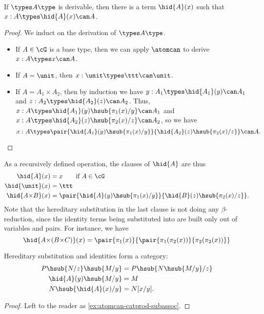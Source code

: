 \begin{lem}\label{thm:catprod-atomcan-idadm}
  If $\types A\type$ is derivable, then there is a term $\hid{A}(x)$ such that $x:A \types \hid{A}(x)\can A$.
\end{lem}
\begin{proof}
  We induct on the derivation of $\types A\type$.
  \begin{itemize}
  \item If $A\in\cG$ is a base type, then we can apply $\atomcan$ to derive $x:A \types x\can A$.
  \item If $A=\unit$, then $x:\unit \types \ttt\can \unit$.
  \item If $A=A_1\times A_2$, then by induction we have $y:A_1 \types \hid{A_1}(y)\can A_1$ and $z:A_2 \types \hid{A_2}(z)\can A_2$.
    Thus, $x:A \types \hid{A_1}(y)\hsub{\pi_1(x)/y}\can A_1$ and $x:A \types \hid{A_2}(z)\hsub{\pi_2(x)/z}\can A_2$, so we have
    \[ x:A \types \pair{\hid{A_1}(y)\hsub{\pi_1(x)/y}}{\hid{A_2}(z)\hsub{\pi_2(x)/z}} \can A.\qedhere\]
  \end{itemize}
\end{proof}

As a recursively defined operation, the clauses of $\hid{A}$ are thus
\begin{align*}
  \hid{A}(x) &= x \qquad\text{if }{A\in\cG}\\
  \hid{\unit}(x) &= \ttt\\
  \hid{A\times B}(x) &= \pair{\hid{A}(y)\hsub{\pi_1(x)/y}}{\hid{B}(z)\hsub{\pi_2(x)/z}}.
\end{align*}
Note that the hereditary substitution in the last clause is not doing any $\beta$-reduction, since the identity terms being substituted into are built only out of variables and pairs.
For instance, we have
\[ \hid{A\times (B\times C)}(x) = \pair{\pi_1(x)}{\pair{\pi_1(\pi_2(x))}{\pi_2(\pi_2(x))}} \]

\begin{lem}\label{thm:atomcan-catprod-subassoc}
  Hereditary substitution and identities form a category:
  \begin{align*}
    P\hsub{N/z}\hsub{M/y} &= P\hsub{N\hsub{M/y}/z}\\
    \hid{A}(y)\hsub{M/y} &= M\\
    N\hsub{\hid{A}(x)/y} &= N[x/y].
  \end{align*}
\end{lem}
\begin{proof}
  Left to the reader as \cref{ex:atomcan-catprod-subassoc}.
\end{proof}

